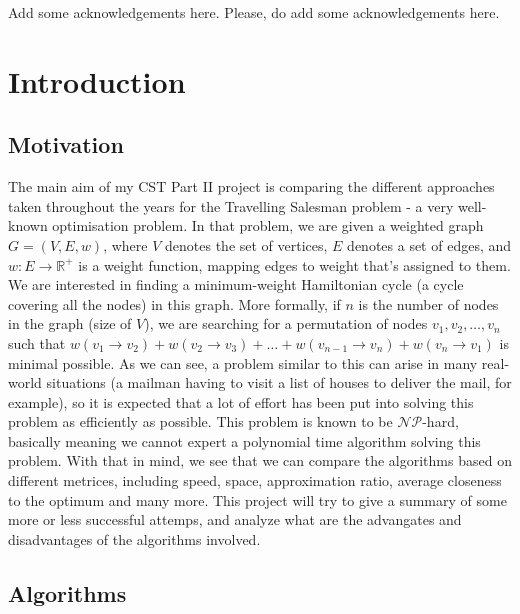 \documentclass[12pt,twoside,notitlepage]{report}
\begin{document}
Add some acknowledgements here. Please, do add some acknowledgements here.


\cleardoublepage        %

\setcounter{page}{1}
\pagestyle{headings}

\chapter{Introduction}

\section{Motivation}

The main aim of my CST Part II project is comparing the different approaches taken throughout the years for the Travelling Salesman problem - a very well-known optimisation problem. In that problem, we are given a weighted graph $G = (V, E, w)$, where $V$ denotes the set of vertices, $E$ denotes a set of edges, and $w : E \rightarrow \mathbb{R}^{+}$ is a weight function, mapping edges to weight that's assigned to them. We are interested in finding a minimum-weight Hamiltonian cycle (a cycle covering all the nodes) in this graph. More formally, if $n$ is the number of nodes in the graph (size of $V$), we are searching for a permutation of nodes $v_1, v_2, \dots, v_{n}$ such that $w(v_1 \rightarrow v_2) + w(v_2 \rightarrow v_3) + \dots + w(v_{n-1} \rightarrow v_n) + w(v_n \rightarrow v_1)$ is minimal possible. As we can see, a problem similar to this can arise in many real-world situations (a mailman having to visit a list of houses to deliver the mail, for example), so it is expected that a lot of effort has been put into solving this problem as efficiently as possible. This problem is known to be $\mathcal{NP}$-hard, basically meaning we cannot expert a polynomial time algorithm solving this problem. With that in mind, we see that we can compare the algorithms based on different metrices, including speed, space, approximation ratio, average closeness to the optimum and many more. This project will try to give a summary of some more or less successful attemps, and analyze what are the advangates and disadvantages of the algorithms involved.

\section{Algorithms}
\end{document}
